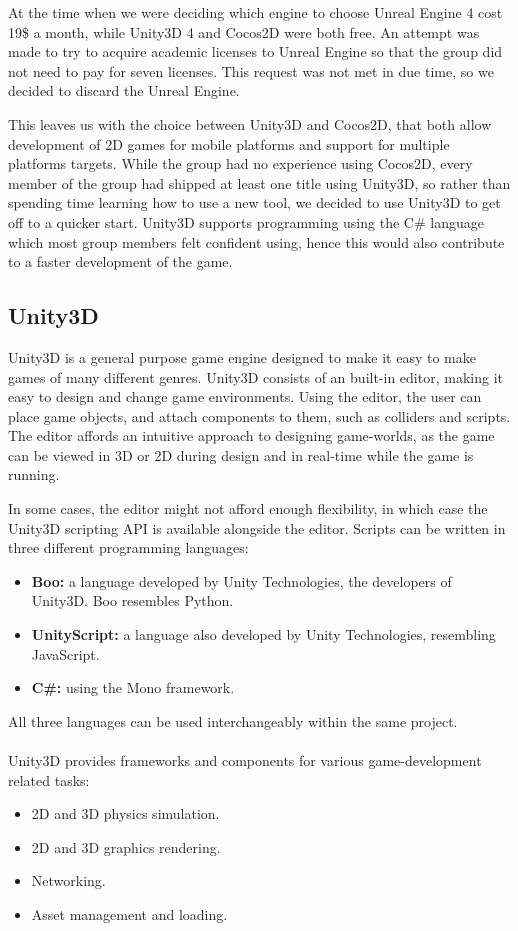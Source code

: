 At the time when we were deciding which engine to choose Unreal Engine 4 cost 19\$ a month\cite{unrealFree}, while Unity3D 4 and Cocos2D were both free. 
An attempt was made to try to acquire academic licenses to Unreal Engine so that the group did not need to pay for seven licenses. 
This request was not met in due time, so we decided to discard the Unreal Engine.

This leaves us with the choice between Unity3D and Cocos2D, that both allow development of 2D games for mobile platforms and support for multiple platforms targets.
While the group had no experience using Cocos2D, every member of the group had shipped at least one title using Unity3D, so rather than spending time learning how to use a new tool, we decided to use Unity3D to get off to a quicker start.
Unity3D supports programming using the C\# language which most group members felt confident using, hence this would also contribute to a faster development of the game.

\subsection{Unity3D}
Unity3D is a general purpose game engine designed to make it easy to make games
of many different genres. Unity3D consists of an built-in editor, making it
easy to design and change game environments. Using the editor, the user can
place game objects, and attach components to them, such as colliders and
scripts. The editor affords an intuitive approach to designing game-worlds, as
the game can be viewed in 3D or 2D during design and in real-time while the
game is running.

In some cases, the editor might not afford enough flexibility, in which case
the Unity3D scripting API is available alongside the editor.
Scripts can be written in three different programming languages:

\begin{itemize}
    \item \textbf{Boo:} a language developed by Unity Technologies, the
        developers of Unity3D. Boo resembles Python.
    \item \textbf{UnityScript:} a language also developed by Unity
        Technologies, resembling JavaScript.
    \item \textbf{C#:} using the Mono framework.
\end{itemize}

All three languages can be used interchangeably within the same project.
\\
\\
Unity3D provides frameworks and components for various game-development related
tasks:
\begin{itemize}
    \item 2D and 3D physics simulation.
    \item 2D and 3D graphics rendering.
    \item Networking.
    \item Asset management and loading.
\end{itemize}

